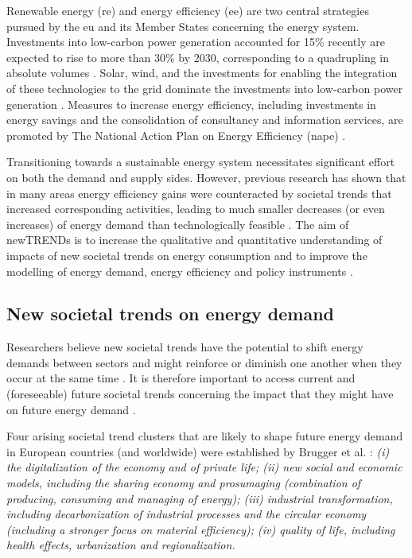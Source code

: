 Renewable energy (\gls{re}) and energy efficiency (\gls{ee}) are two central strategies pursued by the \gls{eu} and its Member States concerning the energy system. 
Investments into low-carbon power generation accounted for 15\% recently are expected to rise to more than 30\% by 2030, corresponding to a quadrupling in absolute volumes \cite{shift}. Solar, wind, and the investments for enabling the integration of these technologies to the grid dominate the investments into low-carbon power generation \cite{shift}. 
Measures to increase energy efficiency, including investments in energy savings and the consolidation of consultancy and information services, are promoted by The National Action Plan on Energy Efficiency (\gls{nape}) \cite{bafa}.  

Transitioning towards a sustainable energy system necessitates significant effort on both the demand and supply sides. 
However, previous research has shown that in many areas energy efficiency gains were counteracted by societal trends that increased corresponding activities, leading to much smaller decreases (or even increases) of energy demand than technologically feasible \cite{2050}. 
The aim of newTRENDs is to increase the qualitative and quantitative understanding of impacts of new societal trends on energy consumption and to improve the modelling of energy demand, energy efficiency and policy instruments \cite{fraunhofer}. 


\subsection{New societal trends on energy demand}


Researchers believe new societal trends have the potential to shift energy demands between sectors and might reinforce or diminish one another when they occur at the same time \cite{2050}. 
It is therefore important to access current and (foreseeable) future societal trends concerning the impact that they might have on future energy demand \cite{2050}. 

Four arising societal trend clusters that are likely to shape future energy demand in European countries (and worldwide) were established by Brugger et al. \cite{2050}:  
\emph{
  (i) the digitalization of the economy and of private life; 
  (ii) new social and economic models, including the sharing economy and prosumaging (combination of producing, consuming and managing of energy); 
  (iii) industrial transformation, including decarbonization of industrial processes and the circular economy (including a stronger focus on material efficiency); 
  (iv) quality of life, including health effects, urbanization and regionalization. 
}

